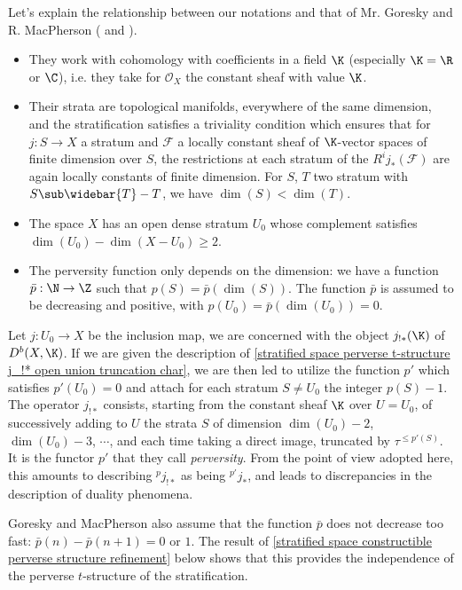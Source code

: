 \begin{remark}
Let's explain the relationship between our notations and that of Mr. Goresky and R. MacPherson (\cite{MPMG_PoincareDuality} and \cite{MPMG_ICT}).
\begin{itemize}
    \item They work with cohomology with coefficients in a field $\K$ (especially $\K=\R$ or $\C$), i.e. they take for $\mathscr{O}_X$ the constant sheaf with value $\K$.
    \item Their strata are topological manifolds, everywhere of the same dimension, and the stratification satisfies a triviality condition which ensures that for $j:S\to X$ a stratum and $\mathscr{F}$ a locally constant sheaf of $\K$-vector spaces of finite dimension over $S$, the restrictions at each stratum of the $R^ij_*(\mathscr{F})$ are again locally constants of finite dimension. For $S$, $T$ two stratum with $S\sub\widebar{T}-T$, we have $\dim(S)<\dim(T)$.
    \item The space $X$ has an open dense stratum $U_0$ whose complement satisfies $\dim(U_0)-\dim(X-U_0)\geq 2$.
    \item The perversity function only depends on the dimension: we have a function $\bar{p}:\N\to\Z$ such that $p(S)=\bar{p}(\dim(S))$. The function $\bar{p}$ is assumed to be decreasing and positive, with $p(U_0)=\bar{p}(\dim(U_0))=0$.
\end{itemize}

Let $j:U_0\to X$ be the inclusion map, we are concerned with the object $j_{!*}(\K)$ of $D^b(X,\K)$. If we are given the description of \cref{stratified space perverse t-structure j_!* open union truncation char}, we are then led to utilize the function $p'$ which satisfies $p'(U_0)=0$ and attach for each stratum $S\neq U_0$ the integer $p(S)-1$. The operator $j_{!*}$ consists, starting from the constant sheaf $\K$ over $U=U_0$, of successively adding to $U$ the strata $S$ of dimension $\dim(U_0)-2$, $\dim(U_0)-3$, $\cdots$, and each time taking a direct image, truncated by $\tau^{\leq p'(S)}$. It is the functor $p'$ that they call \textit{perversity}. From the point of view adopted here, this amounts to describing ${^p\!j_{!*}}$ as being ${^{p'}j_*}$, and leads to discrepancies in the description of duality phenomena.\par
Goresky and MacPherson also assume that the function $\bar{p}$ does not decrease too fast: $\bar{p}(n)-\bar{p}(n+1)=0$ or $1$. The result of \cref{stratified space constructible perverse structure refinement} below shows that this provides the independence of the perverse $t$-structure of the stratification.
\end{remark}

